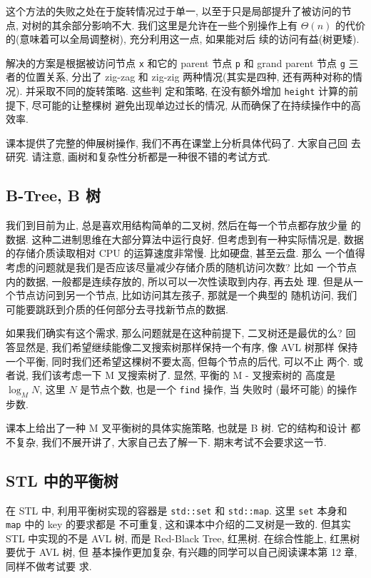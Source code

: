 \documentclass[a4paper]{ctexart}
\theoremstyle{definition}
\theoremstyle{definition}
\begin{document}
这个方法的失败之处在于旋转情况过于单一, 以至于只是局部提升了被访问的节
点, 对树的其余部分影响不大. 我们这里是允许在一些个别操作上有
$\Theta(n)$ 的代价的(意味着可以全局调整树), 充分利用这一点, 如果能对后
续的访问有益(树更矮).

解决的方案是根据被访问节点 \verb|x| 和它的 parent 节点 \verb|p| 和
grand parent 节点 \verb|g| 三者的位置关系, 分出了 zig-zag 和 zig-zig
两种情况(其实是四种, 还有两种对称的情况). 并采取不同的旋转策略. 这些判
定和策略, 在没有额外增加 \verb|height| 计算的前提下, 尽可能的让整棵树
避免出现单边过长的情况, 从而确保了在持续操作中的高效率.

课本提供了完整的伸展树操作, 我们不再在课堂上分析具体代码了. 大家自己回
去研究. 请注意, 画树和复杂性分析都是一种很不错的考试方式.

\subsection{B-Tree, B 树}
我们到目前为止, 总是喜欢用结构简单的二叉树, 然后在每一个节点都存放少量
的数据. 这种二进制思维在大部分算法中运行良好. 但考虑到有一种实际情况是,
数据的存储介质读取相对 CPU 的运算速度非常慢. 比如硬盘, 甚至云盘. 那么
一个值得考虑的问题就是我们是否应该尽量减少存储介质的随机访问次数? 比如
一个节点内的数据, 一般都是连续存放的, 所以可以一次性读取到内存, 再去处
理. 但是从一个节点访问到另一个节点, 比如访问其左孩子, 那就是一个典型的
随机访问, 我们可能要跳跃到介质的任何部分去寻找新节点的数据.

如果我们确实有这个需求, 那么问题就是在这种前提下, 二叉树还是最优的么?
回答显然是, 我们希望继续能像二叉搜索树那样保持一个有序, 像 AVL 树那样
保持一个平衡, 同时我们还希望这棵树不要太高, 但每个节点的后代, 可以不止
两个. 或者说, 我们该考虑一下 M 叉搜索树了. 显然, 平衡的 M - 叉搜索树的
高度是 $\log_M N$, 这里 $N$ 是节点个数, 也是一个 \verb|find| 操作, 当
失败时 (最坏可能) 的操作步数. 

课本上给出了一种 M 叉平衡树的具体实施策略, 也就是 B 树. 它的结构和设计
都不复杂, 我们不展开讲了, 大家自己去了解一下. 期末考试不会要求这一节.

\subsection{STL 中的平衡树}

在 STL 中, 利用平衡树实现的容器是 \verb|std::set| 和
\verb|std::map|. 这里 \verb|set| 本身和 \verb|map| 中的 key 的要求都是
不可重复, 这和课本中介绍的二叉树是一致的. 但其实 STL 中实现的不是 AVL
树, 而是 Red-Black Tree, 红黑树. 在综合性能上, 红黑树要优于 AVL 树, 但
基本操作更加复杂, 有兴趣的同学可以自己阅读课本第 12 章, 同样不做考试要
求.
\end{document}
